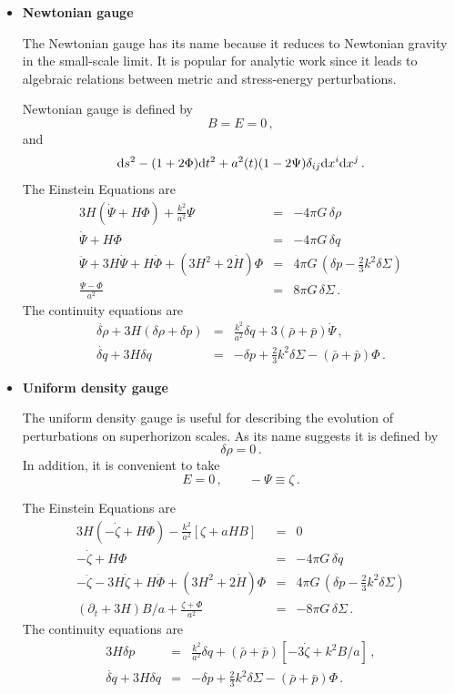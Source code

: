 \documentclass[12pt,letterpaper,rotate]{article}
\def\beq{\begin{equation}}
\def\eeq{\end{equation}}
\def\d{{\rm d}}
\begin{document}
{\begin{itemize}
\item {\bf Newtonian gauge}

The Newtonian gauge has its name because it reduces to Newtonian gravity in the small-scale limit. It is popular for analytic work since it leads to algebraic relations between metric and stress-energy perturbations.

Newtonian gauge is defined by
\beq
B=E=0\, ,
\eeq
and 
\beq
\d s^2 -(1+2\Phi) \d t^2 + a^2(t) (1-2 \Psi) \delta_{ij} \d x^i \d x^j\, .
\eeq
The Einstein Equations are
\begin{eqnarray}
3H(\dot \Psi + H \Phi) + \frac{k^2}{a^2}  \Psi &=& - 4\pi G \, \delta \rho \\
\dot \Psi + H \Phi &=& - 4\pi G \, \delta q\\
\ddot \Psi + 3 H \dot \Psi + H \dot \Phi + (3 H^2 + 2 \dot H) \Phi &=& 4 \pi G\, \left( \delta p - \frac{2}{3} k^2 \delta \Sigma \right) \\
\frac{\Psi - \Phi}{a^2}&=& 8 \pi G\, \delta \Sigma\, .
\end{eqnarray}
The continuity equations are
\begin{eqnarray}
\label{equ:con}
\dot{\delta \rho} + 3 H (\delta \rho + \delta p) &=& \frac{k^2}{a^2} \delta q + 3 (\bar \rho + \bar p)  \dot \Psi \, ,\\
\dot{\delta q} + 3 H \delta q &=& - \delta p + \frac{2}{3} k^2 \delta \Sigma - (\bar \rho + \bar p) \Phi\, .
\end{eqnarray}

\item {\bf Uniform density gauge}

The uniform density gauge is useful for describing the evolution of perturbations on superhorizon scales.
As its name suggests it is defined by
\beq
\delta \rho = 0\, .
\eeq
In addition, it is convenient to take
\beq
E=0\, , \qquad
-\Psi \equiv \zeta\, .
\eeq

The Einstein Equations are
\begin{eqnarray}
3H(- \dot \zeta + H \Phi) - \frac{k^2}{a^2} \left[ \zeta + a H B\right] &=& 0 \label{equ:x1} \\
- \dot \zeta + H \Phi &=& - 4\pi G \, \delta q\\
- \ddot \zeta - 3 H \dot \zeta + H \dot \Phi + (3 H^2 + 2 \dot H) \Phi &=& 4 \pi G\, \left( \delta p - \frac{2}{3} k^2 \delta \Sigma \right) \\
(\partial_t + 3 H)  B/a + \frac{\zeta + \Phi}{a^2}&=& - 8 \pi G\, \delta \Sigma\, .
\end{eqnarray}
The continuity equations are
\begin{eqnarray}
\label{equ:con}
 3 H \delta p&=& \frac{k^2}{a^2} \delta q + (\bar \rho + \bar p) [- 3 \dot \zeta + k^2  B/a] \, ,\\
\dot{\delta q} + 3 H \delta q &=& - \delta p + \frac{2}{3} k^2 \delta \Sigma - (\bar \rho + \bar p) \Phi\, .
\end{eqnarray}


\end{itemize}}
\end{document}
